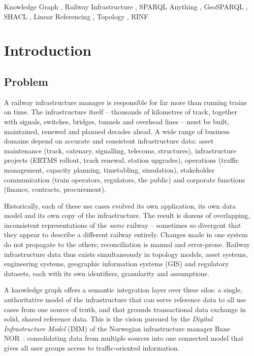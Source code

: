 \documentclass[twocolumn]{ceurart}
\begin{document}
\begin{keywords}
  Knowledge Graph \sep
  Railway Infrastructure \sep
  SPARQL Anything \sep
  GeoSPARQL \sep
  SHACL \sep
  Linear Referencing \sep
  Topology \sep
  RINF
\end{keywords}

\maketitle

\section{Introduction}

\subsection{Problem}

A railway infrastructure manager is responsible for far more than running
trains on time. The infrastructure itself -- thousands of kilometres of track,
together with signals, switches, bridges, tunnels and overhead lines -- must be
built, maintained, renewed and planned decades ahead. A wide range of business
domains depend on accurate and consistent infrastructure data: asset
maintenance (track, catenary, signalling, telecoms, structures), infrastructure
projects (ERTMS rollout, track renewal, station upgrades), operations (traffic
management, capacity planning, timetabling, simulation), stakeholder
communication (train operators, regulators, the public) and corporate functions
(finance, contracts, procurement).

Historically, each of these use cases evolved its own application, its own data
model and its own copy of the infrastructure. The result is dozens of
overlapping, inconsistent representations of the \emph{same} railway --
sometimes so divergent that they appear to describe a different railway
entirely. Changes made in one system do not propagate to the others;
reconciliation is manual and error-prone. Railway infrastructure data thus
exists simultaneously in topology models, asset systems, engineering systems,
geographic information systems (GIS) and regulatory datasets, each with its own
identifiers, granularity and assumptions.

A knowledge graph offers a semantic integration layer over these silos: a
single, authoritative model of the infrastructure that can serve reference data
to all use cases from one source of truth, and that grounds transactional data
exchange in solid, shared reference data. This is the vision pursued by the
\emph{Digital Infrastructure Model} (DIM) of the Norwegian infrastructure
manager Bane NOR~\cite{dim}: consolidating data from multiple sources into one
connected model that gives all user groups access to traffic-oriented
information.
\end{document}
